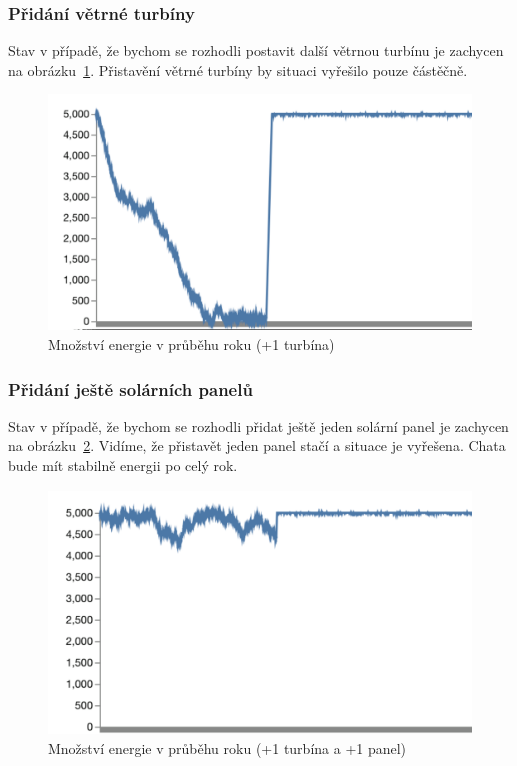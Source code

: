 \subsubsection{Přidání větrné turbíny}

Stav v případě, že bychom se rozhodli postavit další větrnou turbínu je zachycen na obrázku~\ref{fig:graph_2}. Přistavění větrné turbíny by situaci vyřešilo pouze částěčně.

\begin{figure}[H]
    \centering
    \includegraphics[width=.75\textwidth]{images/graph_2.png}\hfill
    \caption{Množství energie v průběhu roku (+1 turbína)}
    \label{fig:graph_2}
\end{figure}


\subsubsection{Přidání ještě solárních panelů}

Stav v případě, že bychom se rozhodli přidat ještě jeden solární panel je zachycen na obrázku~\ref{fig:graph_3}. Vidíme, že přistavět jeden panel stačí a situace je vyřešena. Chata bude mít stabilně energii po celý rok.

\begin{figure}[H]
    \centering
    \includegraphics[width=.75\textwidth]{images/graph_3.png}\hfill
    \caption{Množství energie v průběhu roku (+1 turbína a +1 panel)}
    \label{fig:graph_3}
\end{figure}


